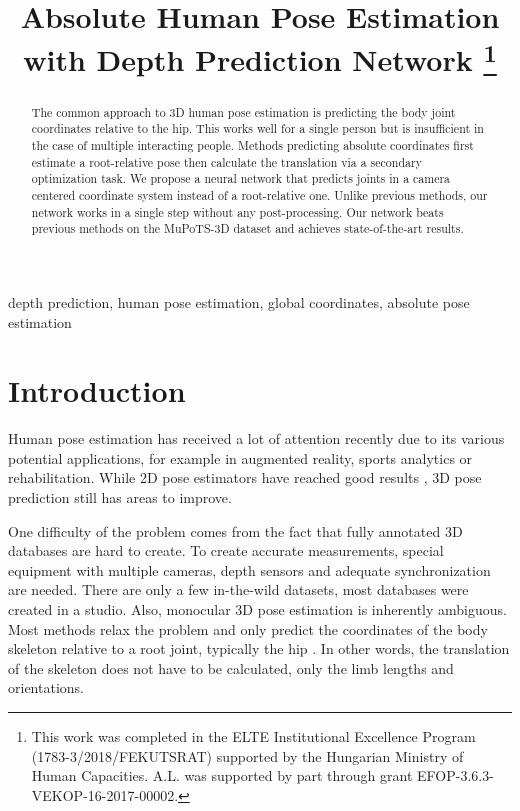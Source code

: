 \documentclass[conference]{IEEEtran}
\begin{document}
\title{Absolute Human Pose Estimation with Depth Prediction Network
\thanks{This work was completed in the ELTE Institutional Excellence Program 
(1783-3/2018/FEKUTSRAT) supported by the Hungarian Ministry of Human Capacities. A.L. was supported by part through grant EFOP-3.6.3-VEKOP-16-2017-00002. }
}

\author{
}

\maketitle

\begin{abstract}
The common approach to 3D human pose estimation is predicting the body joint coordinates relative to the hip. This works well for a single person but is insufficient in the case of multiple interacting people. Methods predicting absolute coordinates first estimate a root-relative pose then calculate the translation via a secondary optimization task. We propose a neural network that predicts joints in a camera centered coordinate system instead of a root-relative one. Unlike previous methods, our network works in a single step without any post-processing. Our network beats previous methods on the MuPoTS-3D dataset and achieves state-of-the-art results.
\end{abstract}

\begin{IEEEkeywords}
depth prediction, human pose estimation, global coordinates, absolute pose estimation
\end{IEEEkeywords}

\section{Introduction}
Human pose estimation has received a lot of attention recently due to its various potential applications, for example in augmented reality, sports analytics or rehabilitation. While 2D pose estimators have reached good results \cite{openpose,stacked_hourglass,alphapose}, 3D pose prediction still has areas to improve.

One difficulty of the problem comes from the fact that fully annotated 3D databases are hard to create. To create accurate measurements, special equipment with multiple cameras, depth sensors and adequate synchronization are needed. There are only a few in-the-wild datasets, most databases were created in a studio. Also,  monocular 3D pose estimation is inherently ambiguous. Most methods relax the problem and only predict the coordinates of the body skeleton relative to a root joint, typically the hip \cite{3dbaseline,drpose,gorog}. In other words, the translation of the skeleton does not have to be calculated, only the limb lengths and orientations.
\end{document}
